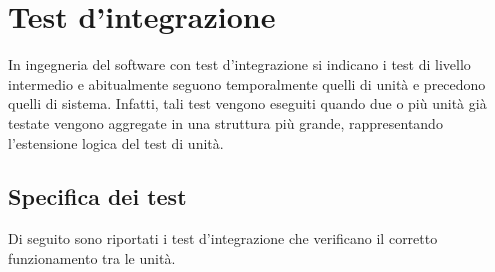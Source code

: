 \section{Test d'integrazione}\label{sec:test-d'integrazione}
In ingegneria del software con test d’integrazione si indicano i test di livello intermedio e abitualmente seguono temporalmente quelli di unità e precedono quelli di sistema.
Infatti, tali test vengono eseguiti quando due o più unità già testate vengono aggregate in una struttura più grande, rappresentando l’estensione logica del test di unità.


\setcounter{rowcount}{0}

\subsection{Specifica dei test}\label{subsec:specifica-dei-test-integrazione}
Di seguito sono riportati i test d'integrazione che verificano il corretto funzionamento tra le unità.

